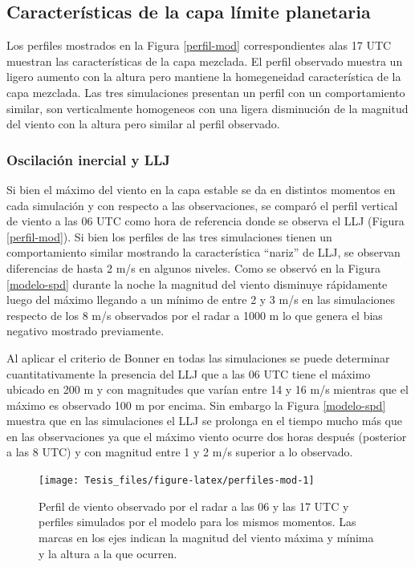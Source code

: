 \documentclass[12pt,spanish,oneside, a4paper]{book}
\begin{document}
\subsection{Características de la capa límite
planetaria}\label{caracteristicas-de-la-capa-limite-planetaria-1}

Los perfiles mostrados en la Figura \ref{perfil-mod} correspondientes
alas 17 UTC muestran las características de la capa mezclada. El perfil
observado muestra un ligero aumento con la altura pero mantiene la
homegeneidad característica de la capa mezclada. Las tres simulaciones
presentan un perfil con un comportamiento similar, son verticalmente
homogeneos con una ligera disminución de la magnitud del viento con la
altura pero similar al perfil observado.

\subsubsection{Oscilación inercial y
LLJ}\label{oscilacion-inercial-y-llj-1}

Si bien el máximo del viento en la capa estable se da en distintos
momentos en cada simulación y con respecto a las observaciones, se
comparó el perfil vertical de viento a las 06 UTC como hora de
referencia donde se observa el LLJ (Figura \ref{perfil-mod}). Si bien
los perfiles de las tres simulaciones tienen un comportamiento similar
mostrando la característica ``nariz'' de LLJ, se observan diferencias de
hasta 2 m/s en algunos niveles. Como se observó en la Figura
\ref{modelo-spd} durante la noche la magnitud del viento disminuye
rápidamente luego del máximo llegando a un mínimo de entre 2 y 3 m/s en
las simulaciones respecto de los 8 m/s observados por el radar a 1000 m
lo que genera el bias negativo mostrado previamente.

Al aplicar el criterio de Bonner en todas las simulaciones se puede
determinar cuantitativamente la presencia del LLJ que a las 06 UTC tiene
el máximo ubicado en 200 m y con magnitudes que varían entre 14 y 16 m/s
mientras que el máximo es observado 100 m por encima. Sin embargo la
Figura \ref{modelo-spd} muestra que en las simulaciones el LLJ se
prolonga en el tiempo mucho más que en las observaciones ya que el
máximo viento ocurre dos horas después (posterior a las 8 UTC) y con
magnitud entre 1 y 2 m/s superior a lo observado.

\begin{figure}

{\centering \texttt{[image: Tesis\_files/figure-latex/perfiles-mod-1]} 

}

\caption{Perfil de viento observado por el radar a las 06 y las 17 UTC y perfiles simulados por el modelo para los mismos momentos. Las marcas en los ejes indican la magnitud del viento máxima y mínima y la altura a la que ocurren. \label{perfil-mod}}\label{fig:perfiles-mod}
\end{figure}
\end{document}

